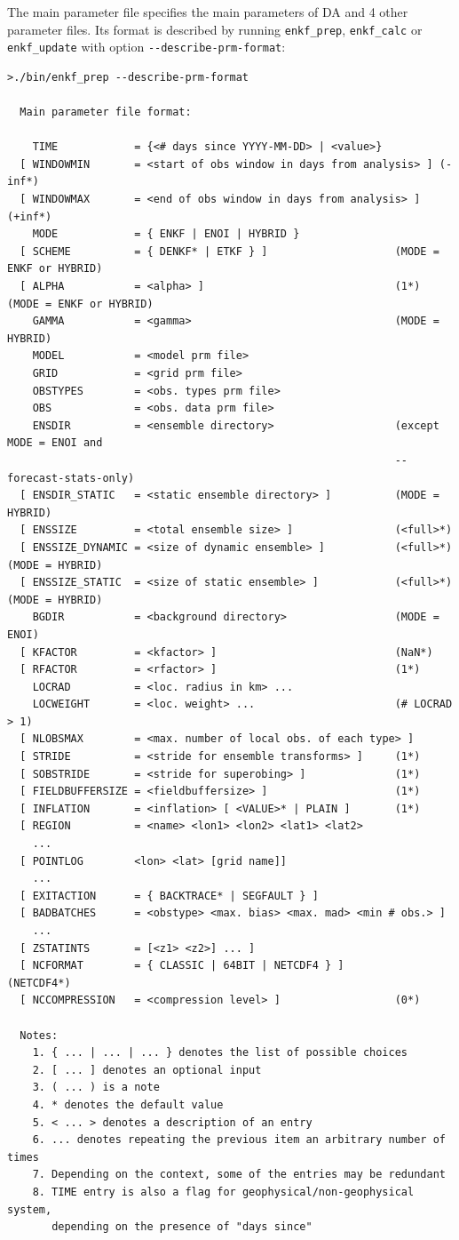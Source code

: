 \documentclass[11pt]{report}
\begin{document}
The main parameter file specifies the main parameters of DA and 4 other parameter files.
Its format is described by running \verb|enkf_prep|, \verb|enkf_calc| or \verb|enkf_update| with option \verb|--describe-prm-format|:
\begin{Verbatim}[frame=single,fontsize=\footnotesize]
>./bin/enkf_prep --describe-prm-format

  Main parameter file format:

    TIME            = {<# days since YYYY-MM-DD> | <value>}
  [ WINDOWMIN       = <start of obs window in days from analysis> ] (-inf*)
  [ WINDOWMAX       = <end of obs window in days from analysis> ]   (+inf*)
    MODE            = { ENKF | ENOI | HYBRID }
  [ SCHEME          = { DENKF* | ETKF } ]                    (MODE = ENKF or HYBRID)
  [ ALPHA           = <alpha> ]                              (1*) (MODE = ENKF or HYBRID)
    GAMMA           = <gamma>                                (MODE = HYBRID)
    MODEL           = <model prm file>
    GRID            = <grid prm file>
    OBSTYPES        = <obs. types prm file>
    OBS             = <obs. data prm file>
    ENSDIR          = <ensemble directory>                   (except MODE = ENOI and
                                                             --forecast-stats-only)
  [ ENSDIR_STATIC   = <static ensemble directory> ]          (MODE = HYBRID)
  [ ENSSIZE         = <total ensemble size> ]                (<full>*)
  [ ENSSIZE_DYNAMIC = <size of dynamic ensemble> ]           (<full>*) (MODE = HYBRID)
  [ ENSSIZE_STATIC  = <size of static ensemble> ]            (<full>*) (MODE = HYBRID)
    BGDIR           = <background directory>                 (MODE = ENOI)
  [ KFACTOR         = <kfactor> ]                            (NaN*)
  [ RFACTOR         = <rfactor> ]                            (1*)
    LOCRAD          = <loc. radius in km> ...
    LOCWEIGHT       = <loc. weight> ...                      (# LOCRAD > 1)
  [ NLOBSMAX        = <max. number of local obs. of each type> ]
  [ STRIDE          = <stride for ensemble transforms> ]     (1*)
  [ SOBSTRIDE       = <stride for superobing> ]              (1*)
  [ FIELDBUFFERSIZE = <fieldbuffersize> ]                    (1*)
  [ INFLATION       = <inflation> [ <VALUE>* | PLAIN ]       (1*)
  [ REGION          = <name> <lon1> <lon2> <lat1> <lat2>
    ...
  [ POINTLOG        <lon> <lat> [grid name]]
    ...
  [ EXITACTION      = { BACKTRACE* | SEGFAULT } ]
  [ BADBATCHES      = <obstype> <max. bias> <max. mad> <min # obs.> ]
    ...
  [ ZSTATINTS       = [<z1> <z2>] ... ]
  [ NCFORMAT        = { CLASSIC | 64BIT | NETCDF4 } ]        (NETCDF4*)
  [ NCCOMPRESSION   = <compression level> ]                  (0*)

  Notes:
    1. { ... | ... | ... } denotes the list of possible choices
    2. [ ... ] denotes an optional input
    3. ( ... ) is a note
    4. * denotes the default value
    5. < ... > denotes a description of an entry
    6. ... denotes repeating the previous item an arbitrary number of times
    7. Depending on the context, some of the entries may be redundant
    8. TIME entry is also a flag for geophysical/non-geophysical system,
       depending on the presence of "days since"
\end{Verbatim}
\end{document}
